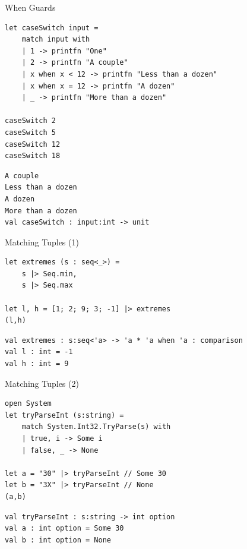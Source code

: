 \documentclass[t]{beamer}
\begin{document}
\begin{frame}[label={sec:org0fd3611},fragile]{When Guards}
 \begin{verbatim}
let caseSwitch input =
    match input with
    | 1 -> printfn "One"
    | 2 -> printfn "A couple"
    | x when x < 12 -> printfn "Less than a dozen" 
    | x when x = 12 -> printfn "A dozen"
    | _ -> printfn "More than a dozen"

caseSwitch 2
caseSwitch 5
caseSwitch 12
caseSwitch 18
\end{verbatim}

\begin{verbatim}
A couple
Less than a dozen
A dozen
More than a dozen
val caseSwitch : input:int -> unit
\end{verbatim}
\end{frame}

\begin{frame}[label={sec:orgb52b282},fragile]{Matching Tuples (1)}
 \begin{verbatim}
let extremes (s : seq<_>) = 
    s |> Seq.min,
    s |> Seq.max

let l, h = [1; 2; 9; 3; -1] |> extremes
(l,h)
\end{verbatim}

\begin{verbatim}
val extremes : s:seq<'a> -> 'a * 'a when 'a : comparison
val l : int = -1
val h : int = 9
\end{verbatim}
\end{frame}

\begin{frame}[label={sec:orgea65332},fragile]{Matching Tuples (2)}
 \begin{verbatim}
open System
let tryParseInt (s:string) =
    match System.Int32.TryParse(s) with 
    | true, i -> Some i
    | false, _ -> None

let a = "30" |> tryParseInt // Some 30
let b = "3X" |> tryParseInt // None
(a,b)
\end{verbatim}

\begin{verbatim}
val tryParseInt : s:string -> int option
val a : int option = Some 30
val b : int option = None
\end{verbatim}
\end{frame}
\end{document}
